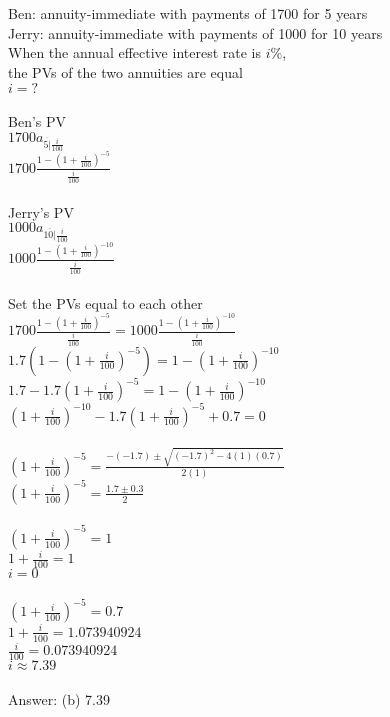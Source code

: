 \documentclass[12pt]{article}
\begin{document}
\section{}
Ben: annuity-immediate with payments of 1700 for 5 years\\
Jerry: annuity-immediate with payments of 1000 for 10 years\\
When the annual effective interest rate is $i\%$,\\
the PVs of the two annuities are equal\\
$i=?$\\
\\
Ben's PV\\
$1700a_{\overline{5|}\frac{i}{100}}$\\
$1700\frac{1-(1+\frac{i}{100})^{-5}}{\frac{i}{100}}$\\
\\
Jerry's PV\\
$1000a_{\overline{10|}\frac{i}{100}}$\\
$1000\frac{1-(1+\frac{i}{100})^{-10}}{\frac{i}{100}}$\\
\\
Set the PVs equal to each other\\
$1700\frac{1-(1+\frac{i}{100})^{-5}}{\frac{i}{100}}=1000\frac{1-(1+\frac{i}{100})^{-10}}{\frac{i}{100}}$\\
$1.7(1-(1+\frac{i}{100})^{-5})=1-(1+\frac{i}{100})^{-10}$\\
$1.7-1.7(1+\frac{i}{100})^{-5}=1-(1+\frac{i}{100})^{-10}$\\
$(1+\frac{i}{100})^{-10}-1.7(1+\frac{i}{100})^{-5}+0.7=0$\\
\\
$(1+\frac{i}{100})^{-5}=\frac{-(-1.7)\pm\sqrt{(-1.7)^{2}-4(1)(0.7)}}{2(1)}$\\
$(1+\frac{i}{100})^{-5}=\frac{1.7\pm0.3}{2}$\\
\\
$(1+\frac{i}{100})^{-5}=1$\\
$1+\frac{i}{100}=1$\\
$i=0$\\
\\
$(1+\frac{i}{100})^{-5}=0.7$\\
$1+\frac{i}{100}=1.073940924$\\
$\frac{i}{100}=0.073940924$\\
$i\approx7.39$\\
\\
Answer: (b) 7.39
\end{document}

